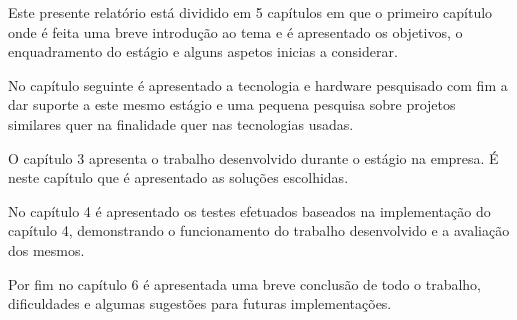 \par Este presente relatório está dividido em 5 capítulos em que o primeiro capítulo onde é feita uma breve introdução ao tema e é apresentado os objetivos, o enquadramento do estágio e alguns aspetos inicias a considerar. 
\par No capítulo seguinte é apresentado a tecnologia e hardware pesquisado com fim a dar suporte a este mesmo estágio e uma pequena pesquisa sobre projetos similares quer na finalidade quer nas tecnologias usadas. 
\par O capítulo 3 apresenta o trabalho desenvolvido durante o estágio na empresa. É neste capítulo que é apresentado as soluções escolhidas. 
\par No capítulo 4 é  apresentado os testes efetuados baseados na implementação do capítulo 4, demonstrando o funcionamento do trabalho desenvolvido e a avaliação dos mesmos. 
\par Por fim no capítulo 6 é apresentada uma breve conclusão de todo o trabalho, dificuldades e algumas sugestões para futuras implementações. 

